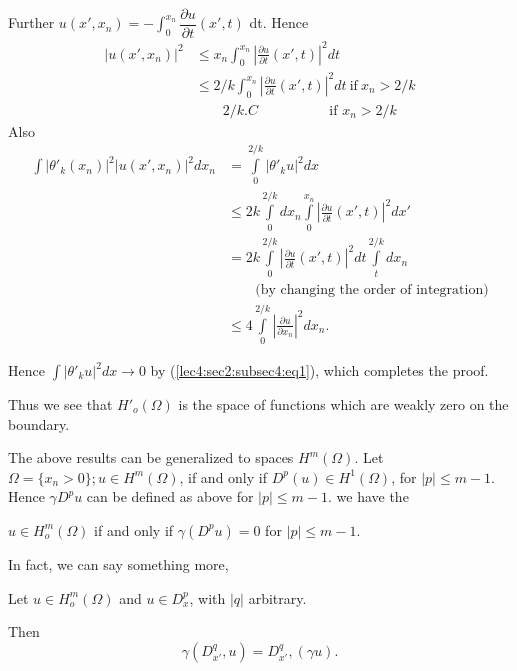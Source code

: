 Further $ u (x', x_n ) = - \int^{x_n}_{0} \dfrac{\partial u }
{\partial t } (x', t)$ dt. Hence  
\begin{align*}
| u (x', x_n) |^2 & \leq x_n \int^{x_n}_{0} | \frac{\partial u}
{\partial t } (x', t) |^2 dt \\ 
& \leq 2/k \int^{x_n}_{0} | \frac{\partial u} {\partial t } (x', t)
|^2 dt  ~\text{if}~ x_n > 2/k \\ 
& \qquad 2/k.C \hspace{2cm} \text { if } x_n > 2/k \tag{1}\label{lec4:sec2:subsec4:eq1} 
\end{align*}
Also\pageoriginale
\begin{align*}
\int |\theta'_k (x_n) |^2 | u(x', x_n) |^2 dx_n & = \int\limits^{2/k}_{0}|
\theta'_k u|^2 dx \\ 
& \le 2k \int\limits^{2/k}_{0} dx_n \int\limits^{x_n}_{0}
\left|\frac{\partial u}{\partial t}(x', t)\right|^2 dx' \\ 
& =2k \int\limits^{2/k}_{0} \left|\frac{\partial u }{ \partial t}(x', t)\right|
^2 dt \int\limits^{2/k}_{t} dx_n \\ 
& \qquad \text{(by changing the order of integration)} \\
& \le 4  \int\limits^{2/k}_{0} |\frac{\partial u}{\partial x_n}|^2 dx_n.
\end{align*}

Hence $\int |\theta'_k u|^2 dx \rightarrow 0$ by (\ref{lec4:sec2:subsec4:eq1}), which
completes the proof. 

Thus we see that $H'_o (\Omega)$ is the space of functions which are
weakly zero on the boundary. 

The above results can be generalized to spaces $H^m(\Omega)$. Let
$\Omega = \{ x_n > 0\}; u \in H^m(\Omega)$, if and only if $D^p(u)
\in H^1 (\Omega)$, for $|p| \le m -1$. Hence $\gamma D^p u$
can be defined as above for $|p| \le m -1$. we have the  
\begin{theorem}\label{lec4:sec2:subsec4:thm2.8}%
$u \in H^m_o(\Omega)$ if and only if $\gamma (D^p u) = 0$ for
  $|p| \le m-1$.  
\end{theorem}

In fact, we can say something more,
\begin{exer*}
Let $u \in H^m_o(\Omega)$ and $u \in D^p_x$, with
$|q|$ arbitrary.  
\end{exer*}

Then
$$
\gamma(D^q_{x'} , u) = D^q_{x'}, (\gamma u).
$$

\subsection{} \label{lec4:sec2:subsec5} %


